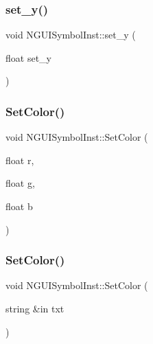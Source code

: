 \subsubsection{\texorpdfstring{set\+\_\+y()}{set\_y()}}
{\footnotesize\ttfamily void N\+G\+U\+I\+Symbol\+Inst\+::set\+\_\+y (\begin{DoxyParamCaption}\item[{float}]{set\+\_\+y }\end{DoxyParamCaption})}

\hypertarget{class_n_g_u_i_symbol_inst_a11756bc336a98048baf30cd8df92963e}{}\label{class_n_g_u_i_symbol_inst_a11756bc336a98048baf30cd8df92963e} 
\subsubsection{\texorpdfstring{Set\+Color()}{SetColor()}\hspace{0.1cm}{\footnotesize\ttfamily [1/2]}}
{\footnotesize\ttfamily void N\+G\+U\+I\+Symbol\+Inst\+::\+Set\+Color (\begin{DoxyParamCaption}\item[{float}]{r,  }\item[{float}]{g,  }\item[{float}]{b }\end{DoxyParamCaption})}

\hypertarget{class_n_g_u_i_symbol_inst_afe876af80b93181735de886ab40393b5}{}\label{class_n_g_u_i_symbol_inst_afe876af80b93181735de886ab40393b5} 
\subsubsection{\texorpdfstring{Set\+Color()}{SetColor()}\hspace{0.1cm}{\footnotesize\ttfamily [2/2]}}
{\footnotesize\ttfamily void N\+G\+U\+I\+Symbol\+Inst\+::\+Set\+Color (\begin{DoxyParamCaption}\item[{string \&in}]{txt }\end{DoxyParamCaption})}

\hypertarget{class_n_g_u_i_symbol_inst_a6285b27500e3f532a6466f8af95af050}{}\label{class_n_g_u_i_symbol_inst_a6285b27500e3f532a6466f8af95af050} 
